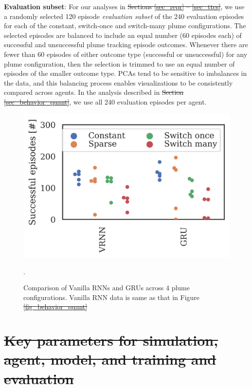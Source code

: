\documentclass[5p,twocolumn,authoryear]{elsarticle}
\providecommand{\DIFaddtex}[1]{{\protect\color{blue}\uwave{#1}}} %
\providecommand{\DIFdeltex}[1]{{\protect\color{red}\sout{#1}}}                      %
\providecommand{\DIFaddbegin}{} %
\providecommand{\DIFaddend}{} %
\providecommand{\DIFdelbegin}{} %
\providecommand{\DIFdelend}{} %
\providecommand{\DIFaddFL}[1]{\DIFadd{#1}} %
\providecommand{\DIFdelFL}[1]{\DIFdel{#1}} %
\providecommand{\DIFaddbeginFL}{} %
\providecommand{\DIFaddendFL}{} %
\providecommand{\DIFdelbeginFL}{} %
\providecommand{\DIFdelendFL}{} %
\providecommand{\DIFadd}[1]{\texorpdfstring{\DIFaddtex{#1}}{#1}} %
\providecommand{\DIFdel}[1]{\texorpdfstring{\DIFdeltex{#1}}{}} %
\newcommand{\DIFscaledelfig}{0.5}
\newlength{\DIFdelgraphicswidth} %
\newlength{\DIFdelgraphicsheight} %
\newcommand{\DIFaddincludegraphics}[2][]{{\color{blue}\fbox{\DIFOincludegraphics[#1]{#2}}}} %
\newcommand{\DIFdelincludegraphics}[2][]{%
\sbox{\DIFdelgraphicsbox}{\DIFOincludegraphics[#1]{#2}}%
\settoboxwidth{\DIFdelgraphicswidth}{\DIFdelgraphicsbox} %
\settoboxtotalheight{\DIFdelgraphicsheight}{\DIFdelgraphicsbox} %
\scalebox{\DIFscaledelfig}{%
\parbox[b]{\DIFdelgraphicswidth}{\usebox{\DIFdelgraphicsbox}\\[-\baselineskip] \rule{\DIFdelgraphicswidth}{0em}}\llap{\resizebox{\DIFdelgraphicswidth}{\DIFdelgraphicsheight}{%
\setlength{\unitlength}{\DIFdelgraphicswidth}%
\begin{picture}(1,1)%
\thicklines\linethickness{2pt} %
{\color[rgb]{1,0,0}\put(0,0){\framebox(1,1){}}}%
{\color[rgb]{1,0,0}\put(0,0){\line( 1,1){1}}}%
{\color[rgb]{1,0,0}\put(0,1){\line(1,-1){1}}}%
\end{picture}%
}\hspace*{3pt}}} %
} %
\DeclareRobustCommand{\DIFaddbegin}{\DIFOaddbegin \let\includegraphics\DIFaddincludegraphics} %
\DeclareRobustCommand{\DIFaddend}{\DIFOaddend \let\includegraphics\DIFOincludegraphics} %
\DeclareRobustCommand{\DIFdelbegin}{\DIFOdelbegin \let\includegraphics\DIFdelincludegraphics} %
\DeclareRobustCommand{\DIFdelend}{\DIFOaddend \let\includegraphics\DIFOincludegraphics} %
\DeclareRobustCommand{\DIFaddbeginFL}{\DIFOaddbeginFL \let\includegraphics\DIFaddincludegraphics} %
\DeclareRobustCommand{\DIFaddendFL}{\DIFOaddendFL \let\includegraphics\DIFOincludegraphics} %
\DeclareRobustCommand{\DIFdelbeginFL}{\DIFOdelbeginFL \let\includegraphics\DIFdelincludegraphics} %
\DeclareRobustCommand{\DIFdelendFL}{\DIFOaddendFL \let\includegraphics\DIFOincludegraphics} %
\begin{document}
\textbf{Evaluation subset}: For \DIFaddbegin \DIFadd{all }\DIFaddend our analyses in \DIFdelbegin \DIFdel{Sections \ref{sec_repr} -- \ref{sec_ttcs}}\DIFdelend \DIFaddbegin \DIFadd{Results}\DIFaddend , we use a randomly selected 120 episode \textit{evaluation subset} of the 240 evaluation episodes for each of the constant, switch-once and switch-many plume configurations.
The selected episodes are balanced to include an equal number (60 episodes each) of successful and unsuccessful plume tracking episode outcomes.
Whenever there are fewer than 60 episodes of either outcome type (successful or unsuccessful) for any plume configuration, then the selection is trimmed to use an equal number of episodes of the smaller outcome type.
PCAs tend to be sensitive to imbalances in the data, and this balancing process enables visualizations to be consistently compared across agents.  
In the analysis described in \DIFdelbegin \DIFdel{Section \ref{sec_behavior_quant}}\DIFdelend \DIFaddbegin \DIFadd{Figure \ref{fig_eigen_mlps}c-e}\DIFaddend , we use all 240 evaluation episodes per agent. \\



\begin{figure}[h!]
\centering
\DIFdelbeginFL %
\DIFdelendFL \DIFaddbeginFL \includegraphics[width=0.45\linewidth]{home_by_arch_VRNN_GRU.png}
\DIFaddendFL \caption{Comparison of Vanilla RNNs and GRUs across 4 plume configurations. Vanilla RNN data is same as that in Figure \DIFdelbeginFL \DIFdelFL{\ref{fig_behavior_quant}}\DIFdelendFL \DIFaddbeginFL \DIFaddFL{\ref{fig_eigen_mlps}}\DIFaddendFL }.
\label{fig_supp_gru}
\end{figure}





\clearpage
\DIFdelbegin \section{\DIFdel{Key parameters for simulation, agent, model, and training and evaluation}}
\addtocounter{section}{-1}%
\end{document}
